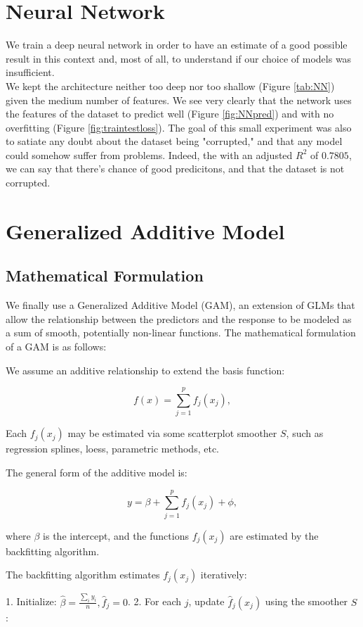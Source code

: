 \documentclass[a4paper, 11pt]{article}
\begin{document}
\begin{multicols}{2}
{\section{Neural Network} \vspace{-7pt}
We train a deep neural network in order to have an estimate of a good possible result in this context and, most of all, to understand if our choice of models was insufficient.\\
We kept the architecture neither too deep nor too shallow (Figure \ref{tab:NN}) given the medium number of features. We see very clearly that the network uses the features of the dataset to predict well (Figure \ref{fig:NNpred}) and with no overfitting (Figure \ref{fig:traintestloss}). The goal of this small experiment was also to satiate any doubt about the dataset being "corrupted," and that any model could somehow suffer from problems. Indeed, the with an adjusted \( R^2 \) of \( 0.7805 \), we can say that there's chance of good predicitons, and that the dataset is not corrupted.

\section{Generalized Additive Model}
\subsection{Mathematical Formulation}
We finally use a Generalized Additive Model (GAM), an extension of GLMs that allow the relationship between the predictors and the response to be modeled as a sum of smooth, potentially non-linear functions.
The mathematical formulation of a GAM is as follows:

We assume an additive relationship to extend the basis function:

\[
f(x) = \sum_{j=1}^p f_j(x_j),
\]


Each \( f_j(x_j) \) may be estimated via some scatterplot smoother \( S \), such as regression splines, loess, parametric methods, etc.

The general form of the additive model is:

\[
y = \beta + \sum_{j=1}^p f_j(x_j) + \phi,
\]

where \( \beta \) is the intercept, and the functions \( f_j(x_j) \) are estimated by the backfitting algorithm.


The backfitting algorithm estimates \( f_j(x_j) \) iteratively:

1. Initialize: \( \hat{\beta} = \frac{\sum_{i} y_i}{n}, \hat{f}_j = 0 \).
2. For each \( j \), update \( \hat{f}_j(x_j) \) using the smoother \( S \):

}
\end{multicols}
\end{document}
